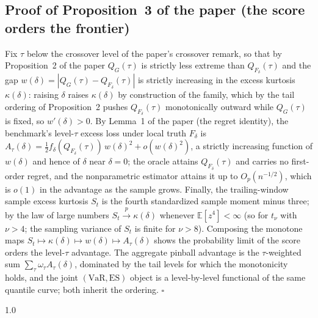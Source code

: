 \documentclass[11pt]{article}
\begin{document}
\subsection*{Proof of Proposition~3 of the paper (the score orders the frontier)}
Fix $\tau$ below the crossover level of the paper's crossover remark, so
that by Proposition~2 of the paper $Q_G(\tau)$ is strictly less extreme
than $Q_{F_\delta}(\tau)$ and the gap $w(\delta)=|Q_G(\tau)-Q_{F_\delta}(\tau)|$
is strictly increasing in the excess kurtosis $\kappa(\delta)$: raising
$\delta$ raises $\kappa(\delta)$ by construction of the family, which by
the tail ordering of Proposition~2 pushes $Q_{F_\delta}(\tau)$
monotonically outward while $Q_G(\tau)$ is fixed, so $w'(\delta)>0$. By
Lemma~1 of the paper (the regret identity), the benchmark's level-$\tau$
excess loss under local truth $F_\delta$ is
$A_\tau(\delta)=\tfrac12 f_\delta(Q_{F_\delta}(\tau))\,w(\delta)^2+o(w(\delta)^2)$,
a strictly increasing function of $w(\delta)$ and hence of $\delta$ near
$\delta=0$; the oracle attains $Q_{F_\delta}(\tau)$ and carries no
first-order regret, and the nonparametric estimator attains it up to
$O_p(n^{-1/2})$, which is $o(1)$ in the advantage as the sample grows.
Finally, the trailing-window sample excess kurtosis $S_t$ is the fourth
standardized sample moment minus three; by the law of large numbers
$S_t\xrightarrow{p}\kappa(\delta)$ whenever $\mathbb{E}[z^4]<\infty$ (so
for $t_\nu$ with $\nu>4$; the sampling variance of $S_t$ is finite for
$\nu>8$). Composing the monotone maps
$S_t\mapsto\kappa(\delta)\mapsto w(\delta)\mapsto A_\tau(\delta)$ shows the
probability limit of the score orders the level-$\tau$ advantage. The
aggregate pinball advantage is the $\tau$-weighted sum
$\sum_\tau \omega_\tau A_\tau(\delta)$, dominated by the tail levels for
which the monotonicity holds, and the joint $(\mathrm{VaR},\mathrm{ES})$
object is a level-by-level functional of the same quantile curve; both
inherit the ordering. \hfill$\square$



\begin{spacing}{1.0}


\end{spacing}
\end{document}
